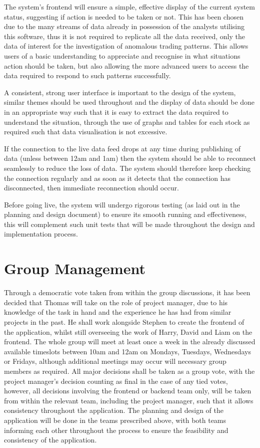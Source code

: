 \documentclass[11pt, oneside, a4paper]{article}
\begin{document}
The system's frontend will ensure a simple, effective display of the current system status, suggesting if action
is needed to be taken or not. This has been chosen due to the many streams of data already in possession of the
analysts utilising this software, thus it is not required to replicate all the data received, only the data of
interest for the investigation of anomalous trading patterns. This allows users of a basic understanding to
appreciate and recognise in what situations action should be taken, but also allowing the more advanced users to
access the data required to respond to such patterns successfully.

A consistent, strong user interface is important to the design of the system, similar themes should be used
throughout and the display of data should be done in an appropriate way such that it is easy to extract the
data required to understand the situation, through the use of graphs and tables for each stock as required such
that data visualisation is not excessive.

If the connection to the live data feed drops at any time during publishing of data (unless between 12am and
1am) then the system should be able to reconnect seamlessly to reduce the loss of data. The system should
therefore keep checking the connection regularly and as soon as it detects that the connection has disconnected,
then immediate reconnection should occur.

Before going live, the system will undergo rigorous testing (as laid out in the planning and design document)
to ensure its smooth running and effectiveness, this will complement such unit tests that will be made throughout
the design and implementation process.

\section{Group Management}
Through a democratic vote taken from within the group discussions, it has been decided that Thomas will take on
the role of project manager, due to his knowledge of the task in hand and the experience he has had from similar
projects in the past. He shall work alongside Stephen to create the frontend of the application, whilst still
overseeing the work of Harry, David and Liam on the frontend. The whole group will meet at least once a week in
the already discussed available timeslots between 10am and 12am on Mondays, Tuesdays, Wednesdays or Fridays, although
additional meetings may occur will necessary group members as required. All major decisions shall be taken as a group
vote, with the project manager's decision counting as final in the case of any tied votes, however, all decisions
involving the frontend or backend team only, will be taken from within the relevant team, including the project manager,
such that it allows consistency throughout the application.
The planning and design of the application will be done in the teams prescribed above, with both teams informing
each other throughout the process to ensure the feasibility and consistency of the application.
\end{document}
